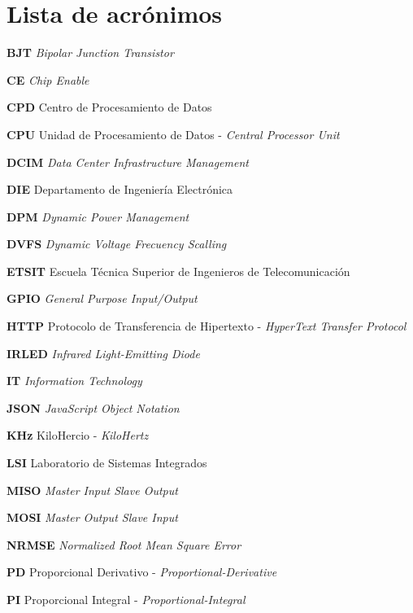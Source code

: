 \chapter*{Lista de acrónimos}\label{acronimos}
\markboth{}{}


\normalsize

\noindent\textbf{BJT} \textit{Bipolar Junction Transistor}

\noindent\textbf{CE} \textit{Chip Enable}

\noindent\textbf{CPD} Centro de Procesamiento de Datos 

\noindent\textbf{CPU} Unidad de Procesamiento de Datos - \textit{Central Processor Unit}

\noindent\textbf{DCIM} \textit{Data Center Infrastructure Management}

\noindent\textbf{DIE} Departamento de Ingeniería Electrónica 

\noindent\textbf{DPM} \textit{Dynamic Power Management} 

\noindent\textbf{DVFS} \textit{Dynamic Voltage Frecuency Scalling}

\noindent\textbf{ETSIT} Escuela Técnica Superior de Ingenieros de Telecomunicación 

\noindent\textbf{GPIO} \textit{General Purpose Input/Output} 

\noindent\textbf{HTTP} Protocolo de Transferencia de Hipertexto - \textit{HyperText Transfer Protocol}

\noindent\textbf{IRLED} \textit{Infrared Light-Emitting Diode} 

\noindent\textbf{IT} \textit{Information Technology} 

\noindent\textbf{JSON} \textit{JavaScript Object Notation} 

\noindent\textbf{KHz} KiloHercio - \textit{KiloHertz} 

\noindent\textbf{LSI} Laboratorio de Sistemas Integrados 

\noindent\textbf{MISO} \textit{Master Input Slave Output}

\noindent\textbf{MOSI} \textit{Master Output Slave Input}

\noindent\textbf{NRMSE} \textit{Normalized Root Mean Square Error} 

\noindent\textbf{PD} Proporcional Derivativo - \textit{Proportional-Derivative}

\noindent\textbf{PI} Proporcional Integral - \textit{Proportional-Integral}

